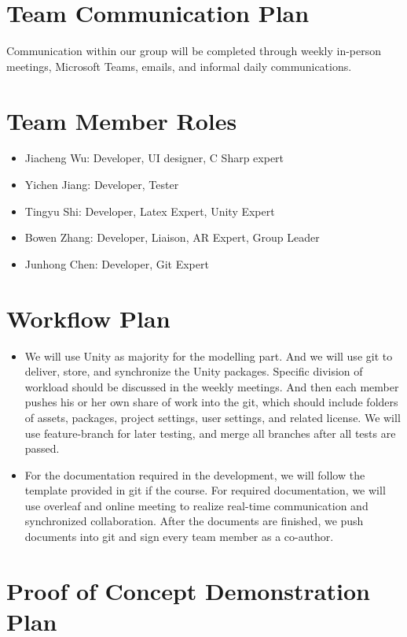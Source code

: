 \documentclass{article}
\begin{document}
\section{Team Communication Plan}
Communication within our group will be completed through weekly in-person meetings, Microsoft Teams, emails, and informal daily communications. 

\section{Team Member Roles}
\begin{itemize}
    \item Jiacheng Wu: Developer, UI designer, C Sharp expert
    \item Yichen Jiang: Developer, Tester
    \item Tingyu Shi: Developer, Latex Expert, Unity Expert
    \item Bowen Zhang: Developer, Liaison, AR Expert, Group Leader
    \item Junhong Chen: Developer, Git Expert
\end{itemize}

\section{Workflow Plan}

\begin{itemize}
	\item We will use Unity as majority for the modelling part. And we will use git to deliver, store, and synchronize the Unity packages. Specific division of workload should be discussed in the weekly meetings. And then each member pushes his or her own share of work into the git, which should include folders of assets, packages, project settings, user settings, and related license. We will use feature-branch for later testing, and merge all branches after all tests are passed. 
	\item For the documentation required in the development, we will follow the template provided in git if the course. For required documentation, we will use overleaf and online meeting to realize real-time communication and synchronized collaboration. After the documents are finished, we push documents into git and sign every team member as a co-author. 
\end{itemize}

\section{Proof of Concept Demonstration Plan}
\end{document}
